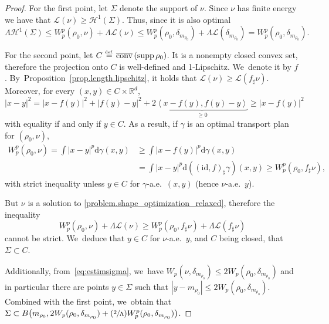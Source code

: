 \documentclass[JEP,XML,SOM,Unicode,NoFloatCountersInSection,published]{cedram}
\newcommand{\Psfrac}[2]{(\sfrac{#1}{#2})}
\theoremstyle{definition}
\newcommand{\eqdef}{\ensuremath{\stackrel{\mbox{\upshape\tiny def.}}{=}}}
\newcommand\cH{\mathcal{H}}
\newcommand\cL{\mathcal{L}}
\newcommand{\RR}{\mathbb{R}}
\DeclareMathOperator{\supp}{supp}
\DeclareMathOperator{\conv}{conv}
\newcommand{\cconv}{\overline{\conv}}
\newcommand\dd{\mathrm{d}}
\newcommand{\abs}[1]{\left\lvert#1\right\rvert}
\begin{document}
\begin{proof}
For the first point, let $\Sigma$ denote the support of $\nu$. Since $\nu$ has finite energy we have that $\mathcal{L}(\nu) \geq \cH^1(\Sigma)$. Thus, since it is also optimal
\begin{equation}\label{eq:estimsigma}
\Lambda \cH^1(\Sigma)
\leq
W^p_p(\rho_0,\nu)+\Lambda \mathcal{L}(\nu) \le
W^p_p(\rho_0,\delta_{m_{\rho_0}})+\Lambda \cL(\delta_{m_{\rho_0}}) = W^p_p(\rho_0,\delta_{m_{\rho_0}}).
\end{equation}

For the second point, let $C\eqdef \cconv\left(\supp \rho_0\right)$. It is a nonempty closed convex set, therefore the projection onto $C$ is well-defined and 1-Lipschitz. We~denote it by $f$. By~Proposition~\ref{prop.length.lipschitz}, it holds that $\cL(\nu)\geq \cL(f_\sharp \nu)$. Moreover, for every $(x,y)\in C\times \RR^d$,
\begin{equation*}
\abs{x-y}^2 =\abs{x-f(y)}^2 + \abs{f(y)-y}^2 +2\underbrace{\left\langle{x-f(y)},{f(y)-y}\right\rangle}_{\geq 0}\geq \abs{x-f(y)}^2
\end{equation*}
with equality if and only if $y \in C$. As a result, if $\gamma$ is an optimal transport plan for $(\rho_0,\nu)$,
\begin{align*}
W_p^p(\rho_0,\nu)= \int \abs{x-y}^p\dd \gamma(x,y) &\geq \int \abs{x-f(y)}^p\dd \gamma(x,y) \\
&=\int \abs{x-y}^p\dd\left((\text{id},f)_\sharp \gamma\right)(x,y) \geq W_p^p(\rho_0,f_\sharp\nu),
\end{align*}
with strict inequality unless $y \in C$ for $\gamma$-a.e.\ $(x,y)$ (hence $\nu$-a.e.\ $y$).

But $\nu$ is a solution to \eqref{problem.shape_optimization_relaxed}, therefore the inequality
\begin{equation*}
W_p^p(\rho_0,\nu)+ \Lambda \cL(\nu)\geq W_p^p(\rho_0,f_\sharp\nu)+ \Lambda \cL(f_\sharp \nu)
\end{equation*}
cannot be strict. We~deduce that $y \in C$ for $\nu$-a.e.\ $y$, and $C$ being closed, that $\Sigma \subset C$.

Additionally, from~\eqref{eq:estimsigma}, we~have
$W_p(\nu,\delta_{m_{\rho_0}})\le 2 W_p(\rho_0,\delta_{m_{\rho_0}})$ and
in particular there are points $y\in \Sigma$ such that
$|y-m_{\rho_0}|\le 2 W_p(\rho_0,\delta_{m_{\rho_0}})$. Combined
with the first point, we~obtain that $\Sigma\subset
B\big({m_{\rho_0}},2W_p(\rho_0,\delta_{m_{\rho_0}})
+ \Psfrac{2}{\Lambda}W_p^p(\rho_0,\delta_{m_{\rho_0}})\big)$.
\end{proof}
\end{document}
